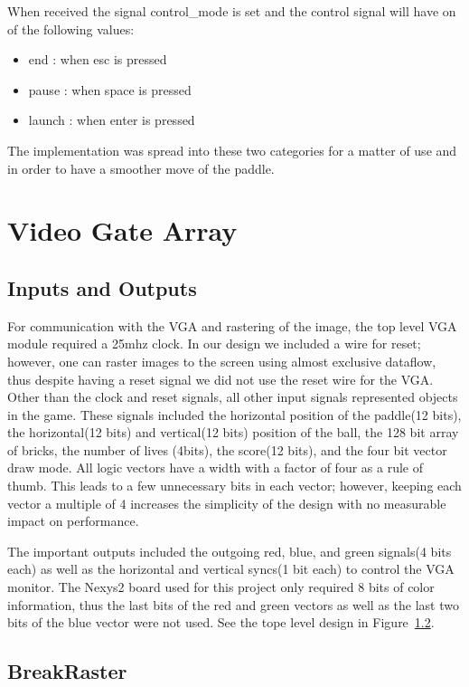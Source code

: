 \documentclass[conference]{IEEEtran}
\begin{document}
When received the signal control_mode is set and the control signal will have on of the following values:
\begin{itemize}
  \item end : when esc is pressed
  \item pause : when space is pressed
  \item launch : when enter is pressed
\end{itemize}

The implementation was spread into these two categories for a matter of use and in order to have a smoother move of the paddle.


\section{Video Gate Array}

\subsection{Inputs and Outputs}

For communication with the VGA and rastering of the image, the top level VGA module required a 25mhz clock. In our design we included a wire for reset; however, one can raster images to the screen using almost exclusive dataflow, thus despite having a reset signal we did not use the reset wire for the VGA. Other than the clock and reset signals, all other input signals represented objects in the game. These signals included the horizontal position of the paddle(12 bits), the horizontal(12 bits) and vertical(12 bits) position of the ball, the 128 bit array of bricks, the number of lives (4bits), the score(12 bits), and the four bit vector draw mode. All logic vectors have a width with a factor of four as a rule of thumb. This leads to a few unnecessary bits in each vector; however, keeping each vector a multiple of 4 increases the simplicity of the design with no measurable impact on performance.

The important outputs included the outgoing red, blue, and green signals(4 bits each) as well as the horizontal and vertical syncs(1 bit each) to control the VGA monitor. The Nexys2 board used for this project only required 8 bits of color information, thus the last bits of the red and green vectors as well as the last two bits of the blue vector were not used. See the tope level design in Figure~\ref{}.

\subsection{BreakRaster}
\end{document}
